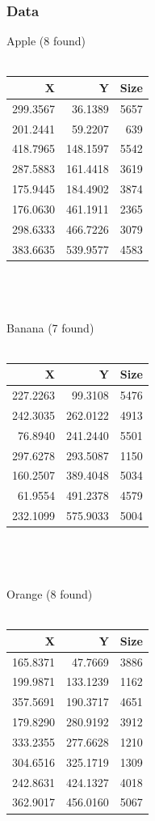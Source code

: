 \documentclass{article}
\begin{document}
\subsubsection{Data}
Apple (8 found)\\~\\
\begin{tabular}{ | r | r | r | }
\hline
\textbf{X} & \textbf{Y} & \textbf{Size}\\
\hline
299.3567 & 36.1389 & 5657\\
\hline
201.2441 & 59.2207 & 639\\
\hline
418.7965 & 148.1597 & 5542\\
\hline
287.5883 & 161.4418 & 3619\\
\hline
175.9445 & 184.4902 & 3874\\
\hline
176.0630 & 461.1911 & 2365\\
\hline
298.6333 & 466.7226 & 3079\\
\hline
383.6635 & 539.9577 & 4583\\
\hline
\end{tabular}
~\\~\\~\\
Banana (7 found)\\~\\
\begin{tabular}{ | r | r | r | }
\hline
\textbf{X} & \textbf{Y} & \textbf{Size}\\
\hline
227.2263 & 99.3108 & 5476\\
\hline
242.3035 & 262.0122 & 4913\\
\hline
76.8940 & 241.2440 & 5501\\
\hline
297.6278 & 293.5087 & 1150\\
\hline
160.2507 & 389.4048 & 5034\\
\hline
61.9554 & 491.2378 & 4579\\
\hline
232.1099 & 575.9033 & 5004\\
\hline
\end{tabular}
~\\~\\~\\
Orange (8 found)\\~\\
\begin{tabular}{ | r | r | r | }
\hline
\textbf{X} & \textbf{Y} & \textbf{Size}\\
\hline
165.8371 & 47.7669 & 3886\\
\hline
199.9871 & 133.1239 & 1162\\
\hline
357.5691 & 190.3717 & 4651\\
\hline
179.8290 & 280.9192 & 3912\\
\hline
333.2355 & 277.6628 & 1210\\
\hline
304.6516 & 325.1719 & 1309\\
\hline
242.8631 & 424.1327 & 4018\\
\hline
362.9017 & 456.0160 & 5067\\
\hline
\end{tabular}
\end{document}
